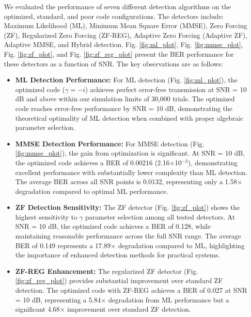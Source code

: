 We evaluated the performance of seven different detection algorithms on the optimized, standard, and poor code configurations. The detectors include: Maximum Likelihood (ML), Minimum Mean Square Error (MMSE), Zero Forcing (ZF), Regularized Zero Forcing (ZF-REG), Adaptive Zero Forcing (Adaptive ZF), Adaptive MMSE, and Hybrid detection. Fig. \ref{fig:ml_plot}, Fig. \ref{fig:mmse_plot}, Fig. \ref{fig:zf_plot}, and Fig. \ref{fig:zf_reg_plot} present the BER performance for these detectors as a function of SNR. The key observations are as follows:
\begin{itemize}
    \item \textbf{ML Detection Performance:} For ML detection (Fig. \ref{fig:ml_plot}), the optimized code (\(\gamma = -i\)) achieves perfect error-free transmission at SNR = 10 dB and above within our simulation limits of 30,000 trials. The optimized code reaches error-free performance by SNR = 10 dB, demonstrating the theoretical optimality of ML detection when combined with proper algebraic parameter selection.
    
    \item \textbf{MMSE Detection Performance:} For MMSE detection (Fig. \ref{fig:mmse_plot}), the gain from optimization is significant. At SNR = 10 dB, the optimized code achieves a BER of 0.00216 (2.16$\times$10$^{-3}$), demonstrating excellent performance with substantially lower complexity than ML detection. The average BER across all SNR points is 0.0132, representing only a 1.58$\times$ degradation compared to optimal ML performance.
    
    \item \textbf{ZF Detection Sensitivity:} The ZF detector (Fig. \ref{fig:zf_plot}) shows the highest sensitivity to \(\gamma\) parameter selection among all tested detectors. At SNR = 10 dB, the optimized code achieves a BER of 0.128, while maintaining reasonable performance across the full SNR range. The average BER of 0.149 represents a 17.89$\times$ degradation compared to ML, highlighting the importance of enhanced detection methods for practical systems.
    
    \item \textbf{ZF-REG Enhancement:} The regularized ZF detector (Fig. \ref{fig:zf_reg_plot}) provides substantial improvement over standard ZF detection. The optimized code with ZF-REG achieves a BER of 0.027 at SNR = 10 dB, representing a 5.84$\times$ degradation from ML performance but a significant 4.68$\times$ improvement over standard ZF detection.
\end{itemize}

